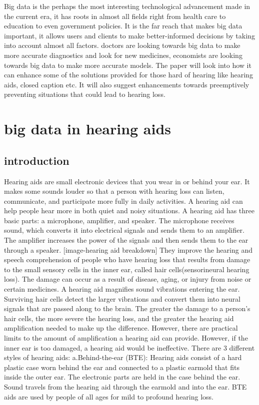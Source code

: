 \documentclass[sigconf]{acmart}
\begin{document}
Big data is the perhaps the most interesting technological advancement made in the current era, it has roots in almost all fields right from health care to education to even government policies. It is the far reach that makes big data important, it allows users and clients to make better-informed decisions by taking into account almost all factors. doctors are looking towards big data to make more accurate diagnostics and look for new medicines, economists are looking towards big data to make more accurate models. The paper will look into how it can enhance some of the solutions provided for those hard of hearing like hearing aids, closed caption etc. It will also suggest enhancements towards preemptively preventing situations that could lead to hearing loss\cite{Wikipedia2017}.

\section{big data in hearing aids}

\subsection{introduction}


Hearing aids are small electronic devices that you wear in or behind your ear. It makes some sounds louder so that a person with hearing loss can listen, communicate, and participate more fully in daily activities. A hearing aid can help people hear more in both quiet and noisy situations. A hearing aid has three basic parts: a microphone, amplifier, and speaker. The microphone receives sound, which converts it into electrical signals and sends them to an amplifier. The amplifier increases the power of the signals and then sends them to the ear through a speaker.
[image-hearing aid breakdown]
They improve the hearing and speech comprehension of people who have hearing loss that results from damage to the small sensory cells in the inner ear, called hair cells(sensorineural hearing loss). The damage can occur as a result of disease, aging, or injury from noise or certain medicines. A hearing aid magnifies sound vibrations entering the ear. Surviving hair cells detect the larger vibrations and convert them into neural signals that are passed along to the brain. The greater the damage to a person’s hair cells, the more severe the hearing loss, and the greater the hearing aid amplification needed to make up the difference. However, there are practical limits to the amount of amplification a hearing aid can provide. However, if the inner ear is too damaged, a hearing aid would be ineffective.
\newline
There are 3 different styles of hearing aids:
\newline
a.Behind-the-ear (BTE):
Hearing aids consist of a hard plastic case worn behind the ear and connected to a plastic earmold that fits inside the outer ear. The electronic parts are held in the case behind the ear. Sound travels from the hearing aid through the earmold and into the ear. BTE aids are used by people of all ages for mild to profound hearing loss.
\end{document}
